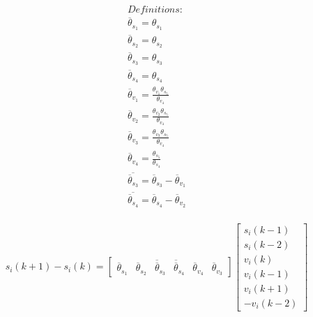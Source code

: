 \documentclass[10pt]{article}         %
\begin{document}
\begin{equation}
\begin{split}
Definitions:\\
\overline{\theta}_{s_1} = \theta_{s_1}\\ 
\overline{\theta}_{s_2} = \theta_{s_2}\\
\overline{\theta}_{s_3} = \theta_{s_3}\\
\overline{\theta}_{s_4} = \theta_{s_4}\\
\overline{\theta}_{v_1} = \frac {\theta_{v_1}\theta_{s_5} } {\theta_{v_4}}\\
\overline{\theta}_{v_2} = \frac {\theta_{v_2}\theta_{s_5} } {\theta_{v_4}}\\
\overline{\theta}_{v_3} = \frac {\theta_{v_3}\theta_{s_5} } {\theta_{v_4}}\\
\overline{\theta}_{v_4} = \frac{\theta_{s_5} } {\theta_{s_4}}\\
\overline{\overline{\theta}_{s_3}} =\overline{\theta}_{s_3} - \overline{\theta}_{v_1} \\
\overline{\overline{\theta}_{s_4}} = \overline{\theta}_{s_4} - \overline{\theta}_{v_2} \\
\end{split}
\end{equation}



\begin{equation}
s_i(k+1) - s_i(k) = \begin{bmatrix} \overline{\theta}_{s_1} & \overline{\theta}_{s_2} & \overline{\overline{\theta}}_{s_3} & \overline{\overline{\theta}}_{s_4} & \overline{\theta}_{v_4} & \overline{\theta}_{v_3} \end{bmatrix} \begin{bmatrix} s_i(k-1) \\ s_i(k-2) \\ v_i(k) \\ v_i(k-1) \\ v_i(k+1) \\ - v_i(k-2) \end{bmatrix}
\end{equation}
\end{document}
